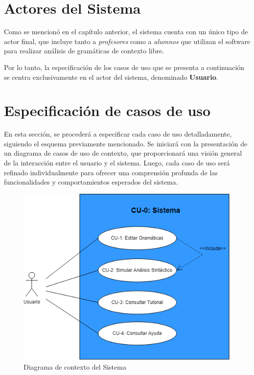\section{Actores del Sistema}

Como se mencionó en el capítulo anterior, el sistema cuenta con un único tipo de actor final, que incluye tanto a \textit{profesores} como a \textit{alumnos} que utilizan el software para realizar análisis de gramáticas de contexto libre.

Por lo tanto, la especificación de los casos de uso que se presenta a continuación se centra exclusivamente en el actor del sistema, denominado \textbf{Usuario}.


\section{Especificación de casos de uso}

En esta sección, se procederá a especificar cada caso de uso detalladamente, siguiendo el esquema previamente mencionado. Se iniciará con la presentación de un diagrama de casos de uso de contexto, que proporcionará una visión general de la interacción entre el usuario y el sistema. Luego, cada caso de uso será refinado individualmente para ofrecer una comprensión profunda de las funcionalidades y comportamientos esperados del sistema.


\begin{figure}[H]
    \begin{center} 
        \includegraphics[scale=0.55]{figuras/Cap7/CU0.png}
        \caption{Diagrama de contexto del Sistema}
        \label{fig:diagramaContexto}
    \end{center}
\end{figure}

